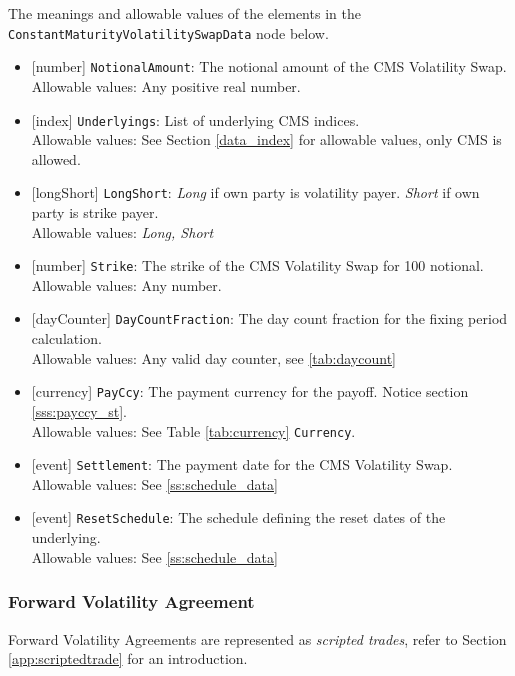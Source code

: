 The meanings and allowable values of the elements in the \lstinline!ConstantMaturityVolatilitySwapData! node below.

\begin{itemize}
  \item{}[number] \lstinline!NotionalAmount!: The notional amount of the CMS Volatility Swap. \\
    Allowable values: Any positive real number.
  \item{}[index] \lstinline!Underlyings!: List of underlying CMS indices. \\
    Allowable values: See Section \ref{data_index} for allowable values, only CMS is allowed.
  \item{}[longShort] \lstinline!LongShort!: \emph{Long} if own party is volatility payer. \emph{Short} if own party is strike payer.\\
    Allowable values: \emph{Long, Short}
  \item{}[number] \lstinline!Strike!: The strike of the CMS Volatility Swap for 100 notional.\\
    Allowable values: Any number.
  \item{}[dayCounter] \lstinline!DayCountFraction!: The day count fraction for the fixing period calculation.\\
    Allowable values: Any valid day counter, see \ref{tab:daycount}
  \item{}[currency] \lstinline!PayCcy!: The payment currency for the payoff.  Notice section \ref{sss:payccy_st}.\\
    Allowable values: See Table \ref{tab:currency} \lstinline!Currency!.
  \item{}[event] \lstinline!Settlement!: The payment date for the CMS Volatility Swap.\\
    Allowable values: See \ref{ss:schedule_data}
  \item{}[event] \lstinline!ResetSchedule!: The schedule defining the reset dates of the underlying.\\
    Allowable values: See \ref{ss:schedule_data}
\end{itemize}

\subsubsection{Forward Volatility Agreement}


Forward Volatility Agreements are represented as {\em scripted trades}, refer to Section
\ref{app:scriptedtrade} for an introduction.

